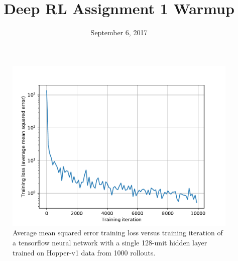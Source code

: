\documentclass{mwhittaker}
\title{Deep RL Assignment 1 Warmup}
\date{September 6, 2017}
\begin{document}
\maketitle{}

\begin{figure}[h]
  \centering
  \includegraphics[width=\textwidth]{sec2.pdf}
  \caption{%
    Average mean squared error training loss versus training iteration of a
    tensorflow neural network with a single 128-unit hidden layer trained on
    Hopper-v1 data from 1000 rollouts.
  }\label{fig:sec2}
\end{figure}
\end{document}
